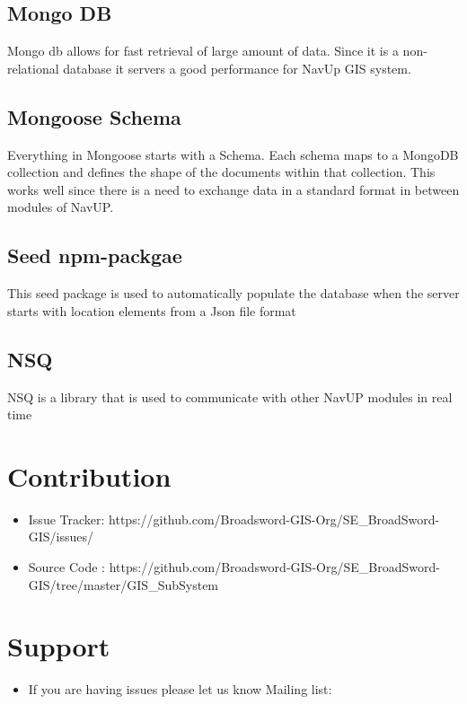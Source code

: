 \documentclass{article}
\begin{document}
	\subsection{Mongo DB}
		Mongo db allows for fast retrieval of large amount of data. Since it is a non-relational database it servers a good 				performance for NavUp GIS system.
	\subsection{Mongoose Schema}
		Everything in Mongoose starts with a Schema. Each schema maps to a MongoDB collection and defines the shape of the 		documents within that collection. 
		This works well since there is a need to exchange data in a standard format in between modules of NavUP.
	\subsection{Seed npm-packgae}
		This seed package is used to automatically populate the database when the server starts with location elements from a Json file format
	\subsection{NSQ}
		NSQ is a library that is used to communicate with other NavUP modules in real time
		
\section{Contribution}
	\begin{itemize}
		\item Issue Tracker: https://github.com/Broadsword-GIS-Org/SE_BroadSword-GIS/issues/
		\item Source Code : https://github.com/Broadsword-GIS-Org/SE_BroadSword-GIS/tree/master/GIS_SubSystem
	\end{itemize}
	
\section{Support}
	\begin{itemize}
		\item If you are having issues please let us know
		Mailing list: 
	\end{itemize}
\end{document}
